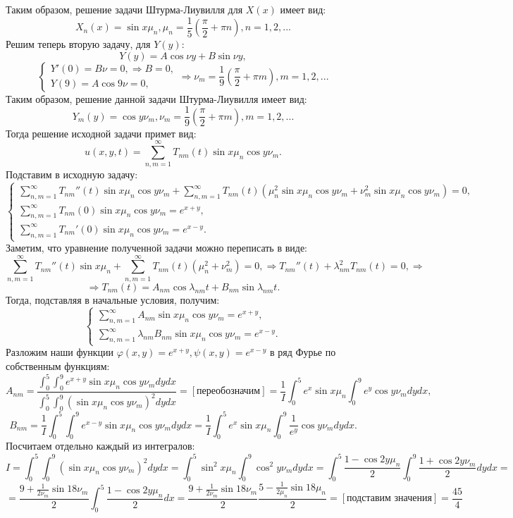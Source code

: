 \documentclass[11pt]{article}
\begin{document}
Таким образом, решение задачи Штурма-Лиувилля для $X(x)$ имеет вид:
$$X_n(x)=\sin{x\mu_n}, \mu_n=\dfrac15 (\frac{\pi}{2}+\pi n), n=1, 2, ...$$
Решим теперь вторую задачу, для $Y(y)$:
$$Y(y)=A\cos{\nu y}+B\sin{\nu y},$$
$$\begin{cases}
    Y'(0)=B\nu=0, \Rightarrow B=0,\\
    Y(9)=A\cos{9\nu}=0, 
\end{cases}\Rightarrow \nu_m=\dfrac19 (\frac{\pi}{2}+\pi m), m=1,2,...$$
Таким образом, решение данной задачи Штурма-Лиувилля имеет вид:
 $$Y_m(y)=\cos{y\nu_m}, \nu_m=\dfrac19 (\frac{\pi}{2}+\pi m), m=1,2,...$$
 Тогда решение исходной задачи примет вид:
 $$u(x,y,t)=\sum_{n,m=1}^\infty T_{nm}(t)\sin{x\mu_n}\cos{y\nu_m}.$$
 Подставим в исходную задачу:
 $$\begin{cases}
    \sum_{n,m=1}^\infty T_{nm}''(t)\sin{x\mu_n}\cos{y\nu_m}+\sum_{n,m=1}^\infty T_{nm}(t)(\mu_n^2 \sin{x\mu_n}\cos{y\nu_m}+\nu_m^2\sin{x\mu_n}\cos{y\nu_m})=0,\\
    \sum_{n,m=1}^\infty T_{nm}(0)\sin{x\mu_n}\cos{y\nu_m}=e^{x+y},\\
    \sum_{n,m=1}^\infty T_{nm}'(0)\sin{x\mu_n}\cos{y\nu_m}=e^{x-y}.
\end{cases}$$
Заметим, что уравнение полученной задачи можно переписать в виде:
$$\sum_{n,m=1}^\infty T_{nm}''(t)\sin{x\mu_n}+\sum_{n,m=1}^\infty T_{nm}(t)(\mu_n^2 +\nu_m^2)=0, \Rightarrow T_{nm}''(t)+\lambda_{nm}^2T_{nm}(t)=0, \Rightarrow $$
$$\Rightarrow T_{nm}(t)=A_{nm}\cos{\lambda_{nm}t}+B_{nm}\sin{\lambda_{nm}t}.$$
Тогда, подставляя в начальные условия, получим:
$$\begin{cases}
    \sum_{n,m=1}^\infty A_{nm}\sin{x\mu_n}\cos{y\nu_m}=e^{x+y},\\
    \sum_{n,m=1}^\infty \lambda_{nm}B_{nm}\sin{x\mu_n}\cos{y\nu_m}=e^{x-y}.
\end{cases}$$
Разложим наши функции $\varphi(x,y)=e^{x+y}, \psi(x,y)=e^{x-y}$ в ряд Фурье по собственным функциям:
$$A_{nm}=\frac{\int_0^5\int_0^9e^{x+y}\sin{x\mu_n}\cos{y\nu_m}dy dx}{\int_0^5\int_0^9(\sin{x\mu_n}\cos{y\nu_m})^2dy dx}=[\text{переобозначим}]=\frac{1}{I}\int_0^5 e^x\sin{x\mu_n}\int_0^9 e^y\cos{y\nu_m}dydx,$$
$$B_{nm}=\frac{1}{I}\int_0^5\int_0^9e^{x-y}\sin{x\mu_n}\cos{y\nu_m}dy dx=\frac{1}{I}\int_0^5 e^x\sin{x\mu_n}\int_0^9 \frac{1}{e^y}\cos{y\nu_m}dydx.$$
Посчитаем отдельно каждый из интегралов:
$$I=\int_0^5\int_0^9(\sin{x\mu_n}\cos{y\nu_m})^2dy dx=\int_0^5\sin^2{x\mu_n}\int_0^9\cos^2{y\nu_m}dy dx=\int_0^5\frac{1-\cos{2y\mu_n}}{2}\int_0^9\frac{1+\cos{2y\nu_m}}{2}dy dx=$$
$$=\frac{9+\frac{1}{2\nu_m}\sin{18\nu_m}}{2}\int_0^5\frac{1-\cos{2y\mu_n}}{2}dx=\frac{9+\frac{1}{2\nu_m}\sin{18\nu_m}}{2}\frac{5-\frac{1}{2\mu_n}\sin{18\mu_n}}{2}=[\text{подставим значения}]=\frac{45}{4}$$
\end{document}
